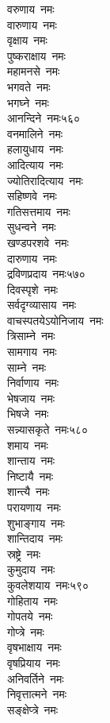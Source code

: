\begin{multicols}{2}
\begin{flushleft}
वरुणाय~नमः\\
वारुणाय~नमः\\
वृक्षाय~नमः\\
पुष्कराक्षाय~नमः\\
महामनसे~नमः\\
भगवते~नमः\\
भगघ्ने~नमः\\
आनन्दिने~नमः\hfill ५६०\\
वनमालिने~नमः\\
हलायुधाय~नमः\\
आदित्याय~नमः\\
ज्योतिरादित्याय~नमः\\
सहिष्णवे~नमः\\
गतिसत्तमाय~नमः\\
सुधन्वने~नमः\\
खण्डपरशवे~नमः\\
दारुणाय~नमः\\
द्रविणप्रदाय~नमः\hfill ५७०\\
दिवस्पृशे~नमः\\
सर्वदृग्व्यासाय~नमः\\
वाचस्पतयेऽयोनिजाय~नमः\\
त्रिसाम्ने~नमः\\
सामगाय~नमः\\
साम्ने~नमः\\
निर्वाणाय~नमः\\
भेषजाय~नमः\\
भिषजे~नमः\\
सन्न्यासकृते~नमः\hfill ५८०\\
शमाय~नमः\\
शान्ताय~नमः\\
निष्टायै~नमः\\
शान्त्यै~नमः\\
परायणाय~नमः\\
शुभाङ्गाय~नमः\\
शान्तिदाय~नमः\\
स्रष्ट्रे~नमः\\
कुमुदाय~नमः\\
कुवलेशयाय~नमः\hfill ५९०\\
गोहिताय~नमः\\
गोपतये~नमः\\
गोप्त्रे~नमः\\
वृषभाक्षाय~नमः\\
वृषप्रियाय~नमः\\
अनिवर्तिने~नमः\\
निवृत्तात्मने~नमः\\
सङ्क्षेप्त्रे~नमः\\

\end{flushleft}
\end{multicols}
